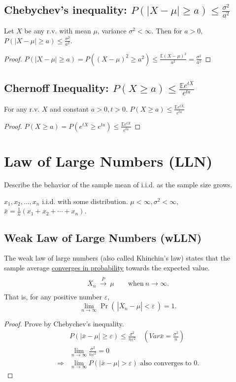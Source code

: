\documentclass[11pt]{elegantbook}
\begin{document}
\subsection{Chebychev's inequality: $P(|X-\mu|\geq a)\leq \frac{\sigma^2}{a^2}$}
Let $X$ be any r.v. with mean $\mu$, variance $\sigma^2<\infty$. Then for $a>0$, $P(|X-\mu|\geq a)\leq \frac{\sigma^2}{a^2}$.
\begin{proof}
$P(|X-\mu|\geq a)=P((X
-\mu)^2\geq a^2)\leq \frac{\mathbb{E}(X-\mu)^2}{a^2}=\frac{\sigma^2}{a^2}$
\end{proof}

\subsection{Chernoff Inequality: $P(X\geq a)\leq \frac{\mathbb{E}e^{tX}}{e^{ta}}$}
For any r.v. $X$ and constant $a>0,t>0$. $P(X\geq a)\leq \frac{\mathbb{E}e^{tX}}{e^{ta}}$
\begin{proof}
$P(X\geq a)=P(e^{tX}\geq e^{ta})\leq \frac{\mathbb{E}e^{tX}}{e^{ta}}$
\end{proof}

\section{Law of Large Numbers (LLN)}
Describe the behavior of the sample mean of i.i.d. as the sample size grows.

$x_{1}, x_{2}, \ldots, x_{n}$ i.i.d. with some distribution. $\mu<\infty,\sigma^{2}<\infty$,$\bar{x}=\frac{1}{n}\left(x_{1}+x_{2}+\cdots+x_{n}\right)$.
\subsection{Weak Law of Large Numbers (wLLN)}
\begin{theorem}
    The weak law of large numbers (also called Khinchin's law) states that the sample average \underline{converges in probability} towards the expected value.
    $${\displaystyle {\begin{matrix}{}\\{\overline {X}}_{n}\ {\xrightarrow {P}}\ \mu \qquad {\text{when}}\ n\to \infty .\\{}\end{matrix}}}$$
    That is, for any positive number $\varepsilon$,
    $${\displaystyle \lim _{n\to \infty }\Pr \!\left(\,|{\overline {X}}_{n}-\mu |<\varepsilon \,\right)=1.}$$
\end{theorem}
\begin{proof}
Prove by Chebychev's inequality.
$$
\begin{aligned}
&P(|\bar{x}-\mu|\geq\varepsilon) \leq \frac{\sigma^{2}}{n \varepsilon^{2}} \quad (Var\bar{x}=\frac{\sigma^{2}}{n}) \\
&\lim_{n \rightarrow \infty}\frac{\sigma^{2}}{n \varepsilon^{2}}=0\\
\Rightarrow&\lim_{n \rightarrow \infty}P(|\bar{x}-\mu|>\varepsilon) \text { also converges to } 0 .
\end{aligned}
$$
\end{proof}
\end{document}
